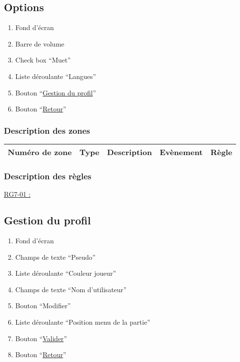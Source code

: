 \documentclass{report}
\begin{document}
\newpage

	\subsection{Options}
	
		\hypertarget{Options}{}
		\label{Options}
	
		
		
		\begin{enumerate}
		  \item Fond d'écran
		  \item Barre de volume
		  \item Check box ``Muet''
		  \item Liste déroulante ``Langues''
		  \item Bouton ``\hyperlink{Page d'accueil}{Gestion du profil}''
		  \item Bouton ``\hyperlink{Page d'accueil}{Retour}''
		\end{enumerate}

		\subsubsection{Description des zones}
		
			\begin{tabular}{|c|c|c|c|c|} \hline
				Numéro de zone & Type  & Description & Evènement &	Règle \\\hline
			\end{tabular}
			
		\subsubsection{Description des règles}

			\underline{RG7-01 :}
				\begin{quote}
				
				\end{quote}
	
\newpage

	\subsection{Gestion du profil}
	
		\hypertarget{Gestion du profil}{}
		\label{Gestion du profil}
		
		
		
		\begin{enumerate}
		  \item Fond d'écran
		  \item Champs de texte ``Pseudo''
		  \item Liste déroulante ``Couleur joueur''
		  \item Champs de texte ``Nom d'utilisateur''
		  \item Bouton ``Modifier''
		  \item Liste déroulante ``Position menu de la partie''
		  \item Bouton ``\hyperlink{Options}{Valider}''
		  \item Bouton ``\hyperlink{Options}{Retour}''
		\end{enumerate}
\end{document}
